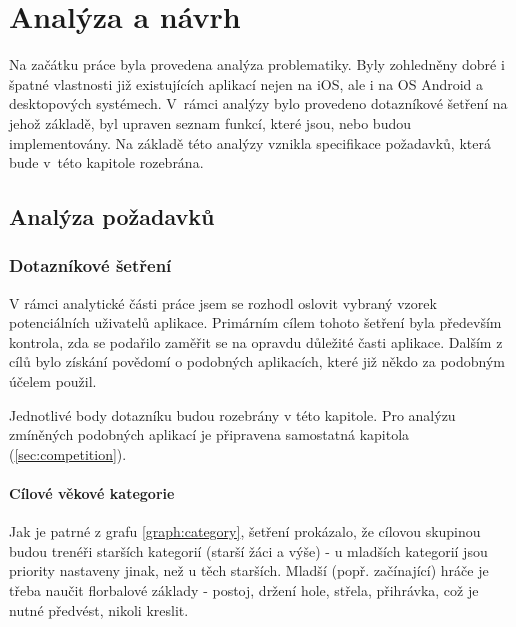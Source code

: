 \documentclass[thesis=B,czech]{FITthesis}[2012/06/26]
\begin{document}
\chapter{Analýza a návrh}

	Na začátku práce byla provedena analýza problematiky. Byly zohledněny dobré i špatné vlastnosti již existujících aplikací nejen na iOS, ale i na OS Android a desktopových systémech. V~rámci analýzy bylo provedeno dotazníkové šetření na jehož základě, byl upraven seznam funkcí, které jsou, nebo budou implementovány. Na základě této analýzy vznikla specifikace požadavků, která bude v~této kapitole rozebrána.

\section{Analýza požadavků}

\subsection{Dotazníkové šetření}

	V rámci analytické části práce jsem se rozhodl oslovit vybraný vzorek potenciálních uživatelů aplikace. Primárním cílem tohoto šetření byla především kontrola, zda se podařilo zaměřit se na opravdu důležité časti aplikace. Dalším z cílů bylo získání povědomí o podobných aplikacích, které již někdo za podobným účelem použil.

	Jednotlivé body dotazníku budou rozebrány v této kapitole. Pro analýzu zmíněných podobných aplikací je připravena samostatná kapitola (\ref{sec:competition}).

\subsubsection{Cílové věkové kategorie} \label{sec:target_group}

	Jak je patrné z grafu \ref{graph:category}, šetření prokázalo, že cílovou skupinou budou trenéři starších kategorií (starší žáci a výše) \-- u mladších kategorií jsou priority nastaveny jinak, než u těch starších. Mladší (popř. začínající) hráče je třeba naučit florbalové základy \-- postoj, držení hole, střela, přihrávka, což je nutné předvést, nikoli kreslit.
\end{document}
